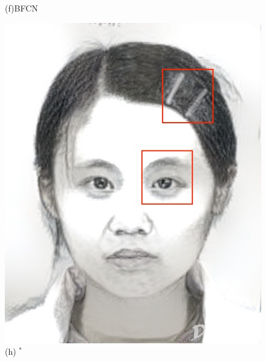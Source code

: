 \documentclass[10pt,twocolumn,letterpaper]{article}
\begin{document}
\begin{figure}[t]
\begin{minipage}[t]{0.23\linewidth}
(f)BFCN\cite{zhang2017content}
\end{minipage}
\begin{minipage}[t]{0.24\linewidth}
\centering
\includegraphics[width=1\linewidth]{img/example_deepart.jpg}
(h) \cite{gatys2015neural}$^*$
\end{minipage}
\begin{minipage}[t]{0.24\linewidth}
\centering

\end{minipage}
\end{figure}
\end{document}
